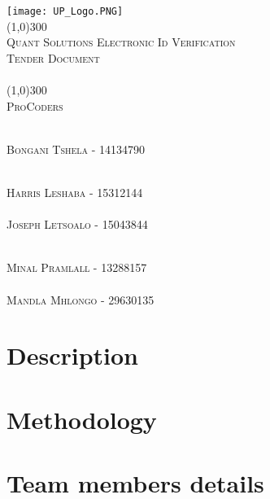 \documentclass[runningheads,a4paper]{article}
\begin{document}
	
	\begin{titlepage}
		\begin{center}
			\texttt{[image: UP\_Logo.PNG]}  \\
			[1cm]
			\line(1,0){300} \\
			[0.3cm]
			\textsc{\Large
				Quant Solutions Electronic Id Verification\\
				Tender Document\\
				\hfill
			}\\
			[0.1cm]
			\line(1,0){300} \\
			[0.7cm]
			\textsc{\Large
				ProCoders
			} \\
		\end{center}
		
		\begin{center}
			\begin{centre}
				\textsc{\large\\
					Bongani Tshela - 14134790\\ 
				}
			
    				\textsc{\large\\
    					Harris Leshaba - 15312144\\ 
    				}
				\textsc{\large\\
					Joseph Letsoalo - 15043844\\ 
				}
				
				\textsc{\large\\
					Minal Pramlall - 13288157\\ 
				}
				\textsc{\large\\
					Mandla Mhlongo - 29630135\\ 
				}
			\end{centre}
			
			
		\end{center}
	\end{titlepage}
	
	\begingroup
	
	\tableofcontents
	\endgroup
	\newpage
	
	\section{Description} %
  \section{Methodology} %
  \section{Team members details}%
  
\end{document}

